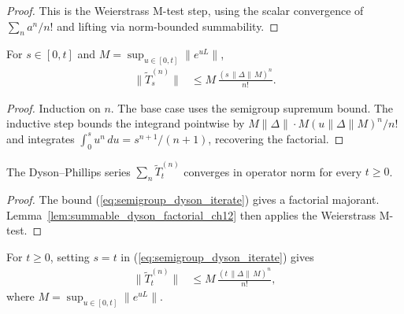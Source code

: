 \begin{proof}
    \leanok
    This is the Weierstrass M-test step, using the scalar convergence of
    $\sum_n a^n/n!$ and lifting via norm-bounded summability.
\end{proof}

\begin{theorem}
    \label{thm:norm_dysonTerm_le_ch12}
    \leanok
    For $s \in [0,t]$ and $M = \sup_{u \in [0,t]} \|e^{uL}\|$,
    \begin{align}
        \|\widetilde{T}^{(n)}_s\|
        &\le M\,\frac{(s\,\|\Delta\|\,M)^n}{n!}.
        \label{eq:semigroup_dyson_iterate}
    \end{align}
\end{theorem}

\begin{proof}
    \leanok
    Induction on $n$. The base case uses the semigroup supremum bound.
    The inductive step bounds the integrand pointwise by
    $M\|\Delta\| \cdot M(u\|\Delta\|M)^n/n!$ and integrates
    $\int_0^s u^n\,du = s^{n+1}/(n+1)$, recovering the factorial.
\end{proof}

\begin{corollary}
    \label{cor:summable_dysonTerm_ch12}
    \leanok
    The Dyson--Phillips series $\sum_n \widetilde{T}^{(n)}_t$
    converges in operator norm for every $t \ge 0$.
\end{corollary}

\begin{proof}
    \leanok
    The bound (\ref{eq:semigroup_dyson_iterate}) gives a factorial majorant.
    Lemma~\ref{lem:summable_dyson_factorial_ch12} then applies the Weierstrass
    M-test.
\end{proof}

\begin{corollary}
    \label{cor:norm_dysonTerm_le_at_ch12}
    \leanok
    For $t \ge 0$, setting $s=t$ in
    (\ref{eq:semigroup_dyson_iterate}) gives
    \begin{align}
        \|\widetilde{T}^{(n)}_t\|
        &\le M\,\frac{(t\,\|\Delta\|\,M)^n}{n!},
        \label{eq:semigroup_dyson_final}
    \end{align}
    where $M = \sup_{u \in [0,t]} \|e^{uL}\|$.
\end{corollary}

